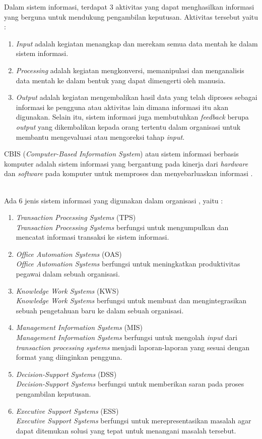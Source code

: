 Dalam sistem informasi, terdapat 3 aktivitas yang dapat menghasilkan informasi yang berguna untuk mendukung pengambilan keputusan. Aktivitas tersebut yaitu \cite{Laudon:1996} : 
\begin{enumerate}
	\item \textit{Input} adalah kegiatan menangkap dan merekam semua data mentah ke dalam sistem informasi.
	\item \textit{Processing} adalah kegiatan mengkonversi, memanipulasi dan menganalisis data mentah ke dalam bentuk yang dapat dimengerti oleh manusia.
	\item \textit{Output} adalah kegiatan mengembalikan hasil data yang telah diproses sebagai informasi ke pengguna atau aktivitas lain dimana informasi itu akan digunakan. Selain itu, sistem informasi juga membutuhkan \textit{feedback} berupa \textit{output} yang dikembalikan kepada orang tertentu dalam organisasi untuk membantu mengevaluasi atau mengoreksi tahap \textit{input}.
\end{enumerate}

CBIS (\textit{Computer-Based Information System}) atau sistem informasi berbasis komputer adalah sistem informasi yang bergantung pada kinerja dari \textit{hardware} dan \textit{software} pada komputer untuk memproses dan menyebarluaskan informasi \cite{Laudon:1996}. \

Ada 6 jenis sistem informasi yang digunakan dalam organisasi \cite{Laudon:1996}, yaitu :
\begin{enumerate}
	\item \textit{Transaction Processing Systems} (TPS)\\
	\textit{Transaction Processing Systems} berfungsi untuk mengumpulkan dan mencatat informasi transaksi ke sistem informasi.
	\item \textit{Office Automation Systems} (OAS)\\
	\textit{Office Automation Systems} berfungsi untuk meningkatkan produktivitas pegawai dalam sebuah organisasi.
	\item \textit{Knowledge Work Systems} (KWS) \\
	\textit{Knowledge Work Systems} berfungsi untuk membuat dan mengintegrasikan sebuah pengetahuan baru ke dalam sebuah organisasi.
	\item \textit{Management Information Systems} (MIS) \\
	\textit{Management Information Systems} berfungsi untuk mengolah \textit{input} dari \textit{transaction processing systems} menjadi laporan-laporan yang sesuai dengan format yang diinginkan pengguna.
	\item \textit{Decision-Support Systems} (DSS) \\
	\textit{Decision-Support Systems} berfungsi untuk memberikan saran pada proses pengambilan keputusan.
	\item \textit{Executive Support Systems} (ESS) \\
	\textit{Executive Support Systems} berfungsi untuk merepresentasikan masalah agar dapat ditemukan solusi yang tepat untuk menangani masalah tersebut.
\end{enumerate}

